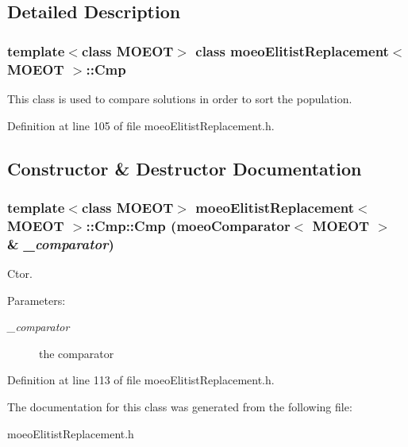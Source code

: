 \subsection{Detailed Description}
\subsubsection*{template$<$class MOEOT$>$ class moeo\-Elitist\-Replacement$<$ MOEOT $>$::Cmp}

This class is used to compare solutions in order to sort the population. 



Definition at line 105 of file moeo\-Elitist\-Replacement.h.

\subsection{Constructor \& Destructor Documentation}
\subsubsection{\setlength{\rightskip}{0pt plus 5cm}template$<$class MOEOT$>$ {\bf moeo\-Elitist\-Replacement}$<$ MOEOT $>$::Cmp::Cmp ({\bf moeo\-Comparator}$<$ MOEOT $>$ \& {\em \_\-comparator})\hspace{0.3cm}{\tt  [inline]}}\label{classmoeoElitistReplacement_1_1Cmp_79fd35cce3f2d5081a9ed0ee58c25ef8}


Ctor. 

\begin{Desc}
\item[Parameters:]
\begin{description}
\item[{\em \_\-comparator}]the comparator \end{description}
\end{Desc}


Definition at line 113 of file moeo\-Elitist\-Replacement.h.

The documentation for this class was generated from the following file:\begin{CompactItemize}
\item 
moeo\-Elitist\-Replacement.h\end{CompactItemize}
